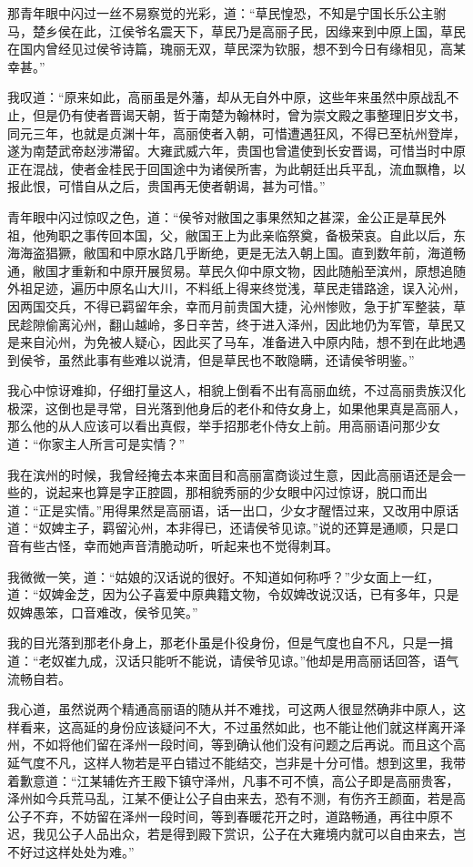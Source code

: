 那青年眼中闪过一丝不易察觉的光彩，道：“草民惶恐，不知是宁国长乐公主驸马，楚乡侯在此，江侯爷名震天下，草民乃是高丽子民，因缘来到中原上国，草民在国内曾经见过侯爷诗篇，瑰丽无双，草民深为钦服，想不到今日有缘相见，高某幸甚。”

我叹道：“原来如此，高丽虽是外藩，却从无自外中原，这些年来虽然中原战乱不止，但是仍有使者晋谒天朝，哲于南楚为翰林时，曾为崇文殿之事整理旧岁文书，同元三年，也就是贞渊十年，高丽使者入朝，可惜遭遇狂风，不得已至杭州登岸，遂为南楚武帝赵涉滞留。大雍武威六年，贵国也曾遣使到长安晋谒，可惜当时中原正在混战，使者金桂民于回国途中为诸侯所害，为此朝廷出兵平乱，流血飘橹，以报此恨，可惜自从之后，贵国再无使者朝谒，甚为可惜。”

青年眼中闪过惊叹之色，道：“侯爷对敝国之事果然知之甚深，金公正是草民外祖，他殉职之事传回本国，父，敝国王上为此亲临祭奠，备极荣哀。自此以后，东海海盗猖獗，敝国和中原水路几乎断绝，更是无法入朝上国。直到数年前，海道畅通，敝国才重新和中原开展贸易。草民久仰中原文物，因此随船至滨州，原想追随外祖足迹，遍历中原名山大川，不料纸上得来终觉浅，草民走错路途，误入沁州，因两国交兵，不得已羁留年余，幸而月前贵国大捷，沁州惨败，急于扩军整装，草民趁隙偷离沁州，翻山越岭，多日辛苦，终于进入泽州，因此地仍为军管，草民又是来自沁州，为免被人疑心，因此买了马车，准备进入中原内陆，想不到在此地遇到侯爷，虽然此事有些难以说清，但是草民也不敢隐瞒，还请侯爷明鉴。”

我心中惊讶难抑，仔细打量这人，相貌上倒看不出有高丽血统，不过高丽贵族汉化极深，这倒也是寻常，目光落到他身后的老仆和侍女身上，如果他果真是高丽人，那么他的从人应该可以看出真假，举手招那老仆侍女上前。用高丽语问那少女道：“你家主人所言可是实情？”

我在滨州的时候，我曾经掩去本来面目和高丽富商谈过生意，因此高丽语还是会一些的，说起来也算是字正腔圆，那相貌秀丽的少女眼中闪过惊讶，脱口而出道：“正是实情。”用得果然是高丽语，话一出口，少女才醒悟过来，又改用中原话道：“奴婢主子，羁留沁州，本非得已，还请侯爷见谅。”说的还算是通顺，只是口音有些古怪，幸而她声音清脆动听，听起来也不觉得刺耳。

我微微一笑，道：“姑娘的汉话说的很好。不知道如何称呼？”少女面上一红，道：“奴婢金芝，因为公子喜爱中原典籍文物，令奴婢改说汉话，已有多年，只是奴婢愚笨，口音难改，侯爷见笑。”

我的目光落到那老仆身上，那老仆虽是仆役身份，但是气度也自不凡，只是一揖道：“老奴崔九成，汉话只能听不能说，请侯爷见谅。”他却是用高丽话回答，语气流畅自若。

我心道，虽然说两个精通高丽语的随从并不难找，可这两人很显然确非中原人，这样看来，这高延的身份应该疑问不大，不过虽然如此，也不能让他们就这样离开泽州，不如将他们留在泽州一段时间，等到确认他们没有问题之后再说。而且这个高延气度不凡，这样人物若是平白错过不能结交，岂非是十分可惜。想到这里，我带着歉意道：“江某辅佐齐王殿下镇守泽州，凡事不可不慎，高公子即是高丽贵客，泽州如今兵荒马乱，江某不便让公子自由来去，恐有不测，有伤齐王颜面，若是高公子不弃，不妨留在泽州一段时间，等到春暖花开之时，道路畅通，再往中原不迟，我见公子人品出众，若是得到殿下赏识，公子在大雍境内就可以自由来去，岂不好过这样处处为难。”

